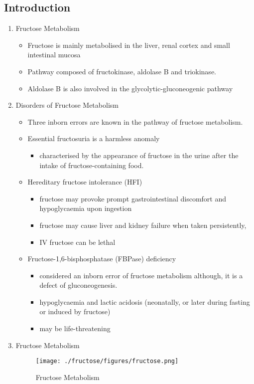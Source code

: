 \documentclass{scrartcl}
\begin{document}
\subsection{Introduction}
\label{sec:orgaacb695}
\begin{enumerate}
\item Fructose Metabolism
\label{sec:org43fbf4b}
\begin{itemize}
\item Fructose is mainly metabolised in the liver, renal cortex and small intestinal mucosa
\item Pathway composed of fructokinase, aldolase B and triokinase.
\item Aldolase B is also involved in the glycolytic-gluconeogenic pathway
\end{itemize}

\item Disorders of Fructose Metabolism
\label{sec:org9f9b7cb}
\begin{itemize}
\item Three inborn errors are known in the pathway of fructose metabolism.
\item Essential fructosuria is a harmless anomaly
\begin{itemize}
\item characterised by the appearance of fructose in the urine after the intake of fructose-containing food.
\end{itemize}
\item Hereditary fructose intolerance (HFI)
\begin{itemize}
\item fructose may provoke prompt gastrointestinal discomfort and hypoglycaemia upon ingestion
\item fructose may cause liver and kidney failure when taken persistently,
\item IV fructose can be lethal
\end{itemize}
\item Fructose-1,6-bisphosphatase (FBPase) deficiency
\begin{itemize}
\item considered an inborn error of fructose metabolism although, it is a defect of gluconeogenesis.
\item hypoglycaemia and lactic acidosis (neonatally, or later during fasting or induced by fructose)
\item may be life-threatening
\end{itemize}
\end{itemize}

\item Fructose Metabolism
\label{sec:org75c42d9}
\begin{figure}[htbp]
\centering
\texttt{[image: ./fructose/figures/fructose.png]}
\caption[Fructose]{\label{fig:org8625b8c}
Fructose Metabolism}
\end{figure}
\end{enumerate}
\end{document}
